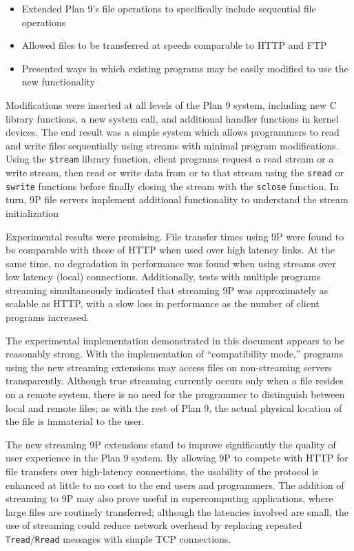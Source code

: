 \documentclass[11pt,american]{report}
\begin{document}
\begin{itemize}
	\item Extended Plan 9's file operations to specifically include sequential file operations
	\item Allowed files to be transferred at speeds comparable to HTTP and FTP
	\item Presented ways in which existing programs may be easily modified to use the new functionality
\end{itemize}

Modifications were inserted at all levels of the Plan 9 system, including new C library functions, a new system call, and additional handler functions in kernel devices. The end result was a simple system which allows programmers to read and write files sequentially using streams with minimal program modifications. Using the {\tt stream} library function, client programs request a read stream or a write stream, then read or write data from or to that stream using the {\tt sread} or {\tt swrite} functions before finally closing the stream with the {\tt sclose} function. In turn, 9P file servers implement additional functionality to understand the stream initialization 

Experimental results were promising. File transfer times using 9P were found to be comparable with those of HTTP when used over high latency links. At the same time, no degradation in performance was found when using streams over low latency (local) connections. Additionally, tests with multiple programs streaming simultaneously indicated that streaming 9P was approximately as scalable as HTTP, with a slow loss in performance as the number of client programs increased.

The experimental implementation demonstrated in this document appears to be reasonably strong. With the implementation of ``compatibility mode,'' programs using the new streaming extensions may access files on non-streaming servers transparently. Although true streaming currently occurs only when a file resides on a remote system, there is no need for the programmer to distinguish between local and remote files; as with the rest of Plan 9, the actual physical location of the file is immaterial to the user.

The new streaming 9P extensions stand to improve significantly the quality of user experience in the Plan 9 system. By allowing 9P to compete with HTTP for file transfers over high-latency connections, the usability of the protocol is enhanced at little to no cost to the end users and programmers. The addition of streaming to 9P may also prove useful in supercomputing applications, where large files are routinely transferred; although the latencies involved are small, the use of streaming could reduce network overhead by replacing repeated {\tt Tread}/{\tt Rread} messages with simple TCP connections.
\end{document}
